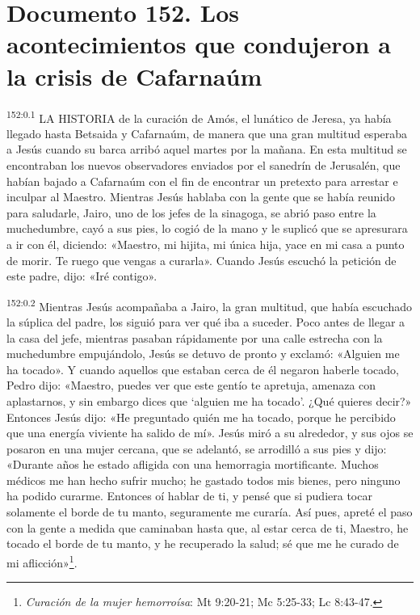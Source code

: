 \chapter{Documento 152. Los acontecimientos que condujeron a la crisis de Cafarnaúm}
\par 
\textsuperscript{152:0.1} LA HISTORIA de la curación de Amós, el lunático de Jeresa, ya había llegado hasta Betsaida y Cafarnaúm, de manera que una gran multitud esperaba a Jesús cuando su barca arribó aquel martes por la mañana. En esta multitud se encontraban los nuevos observadores enviados por el sanedrín de Jerusalén, que habían bajado a Cafarnaúm con el fin de encontrar un pretexto para arrestar e inculpar al Maestro. Mientras Jesús hablaba con la gente que se había reunido para saludarle, Jairo, uno de los jefes de la sinagoga, se abrió paso entre la muchedumbre, cayó a sus pies, lo cogió de la mano y le suplicó que se apresurara a ir con él, diciendo: «Maestro, mi hijita, mi única hija, yace en mi casa a punto de morir. Te ruego que vengas a curarla». Cuando Jesús escuchó la petición de este padre, dijo: «Iré contigo».

\par 
\textsuperscript{152:0.2} Mientras Jesús acompañaba a Jairo, la gran multitud, que había escuchado la súplica del padre, los siguió para ver qué iba a suceder. Poco antes de llegar a la casa del jefe, mientras pasaban rápidamente por una calle estrecha con la muchedumbre empujándolo, Jesús se detuvo de pronto y exclamó: «Alguien me ha tocado». Y cuando aquellos que estaban cerca de él negaron haberle tocado, Pedro dijo: «Maestro, puedes ver que este gentío te apretuja, amenaza con aplastarnos, y sin embargo dices que `alguien me ha tocado'. ¿Qué quieres decir?» Entonces Jesús dijo: «He preguntado quién me ha tocado, porque he percibido que una energía viviente ha salido de mí». Jesús miró a su alrededor, y sus ojos se posaron en una mujer cercana, que se adelantó, se arrodilló a sus pies y dijo: «Durante años he estado afligida con una hemorragia mortificante. Muchos médicos me han hecho sufrir mucho; he gastado todos mis bienes, pero ninguno ha podido curarme. Entonces oí hablar de ti, y pensé que si pudiera tocar solamente el borde de tu manto, seguramente me curaría. Así pues, apreté el paso con la gente a medida que caminaban hasta que, al estar cerca de ti, Maestro, he tocado el borde de tu manto, y he recuperado la salud; sé que me he curado de mi aflicción»\footnote{\textit{Curación de la mujer hemorroísa}: Mt 9:20-21; Mc 5:25-33; Lc 8:43-47.}.

